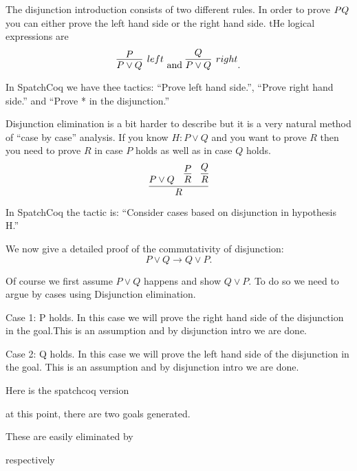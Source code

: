 \begin{itemize}
The disjunction introduction consists of two different rules. In order to prove $P\/Q$ you can either prove the left hand side or the right hand side.  tHe logical expressions are
$$\infer[left]{P\lor Q}{P} \mbox{ and } \infer[right]{P\lor Q}{Q}.$$

In SpatchCoq we have thee tactics: ``Prove left hand side.'', ``Prove right hand side.'' and 
``Prove * in the disjunction.''

Disjunction elimination is a bit harder to describe but it is a very natural method of ``case by case'' analysis. If you know $H: P\lor Q$ and you  want to prove $R$ then you need to prove $R$ in case $P$ holds as well as in case $Q$ holds.
$$\infer{R}{P\lor Q &\infer{R}{P} & \infer{R}{Q}}$$

In SpatchCoq the tactic is: ``Consider cases based on disjunction in hypothesis H.''

We now give a detailed proof of the commutativity of disjunction:
$$P\lor Q \rightarrow Q\lor P.$$ 

Of course we first assume $P\lor Q$ happens and show $Q \lor P$. To do so we need to argue by cases using Disjunction elimination.

Case 1: P holds. In this case we will prove the right hand side of the disjunction in the goal.This is an assumption and by disjunction intro we are done.

Case 2: Q holds. In this case we will prove the left hand side of the disjunction in the goal. This is an assumption  and by disjunction intro we are done.

Here is the spatchcoq version


at this point, there are two goals generated.


These are easily eliminated by

respectively 




\end{itemize}
